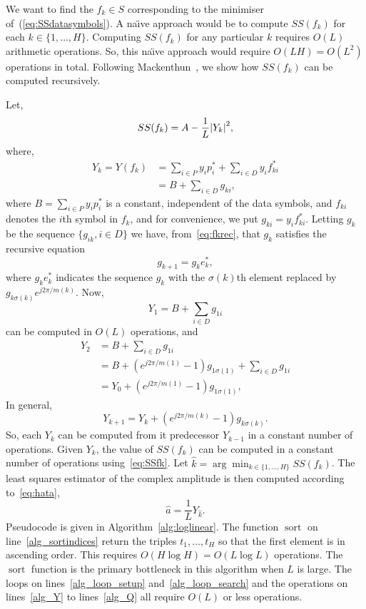 \documentclass[journal]{IEEEtran}
\begin{document}
We want to find the $f_k \in S$ corresponding to the minimiser of~(\ref{eq:SSdatasymbols}).  A na\"{\i}ve approach would be to compute $SS(f_k)$ for each $k \in \{1,\dots,H\}$.  Computing $SS(f_k)$ for any particular $k$ requires $O(L)$ arithmetic operations.  So, this na\"{\i}ve approach would require $O(LH) = O(L^2)$ operations in total.  Following Mackenthun~\cite{Mackenthun1994}, we show how $SS(f_k)$ can be computed recursively.

Let,
\begin{equation}\label{eq:SSfk}
SS(f_k) = A - \frac{1}{L}{\left\vert Y_k \right\vert}^2,
\end{equation}
where, 
\begin{align*}
Y_k = Y( f_k ) &= \sum_{i \in P} y_i p_i^*  + \sum_{i \in D} y_i f_{ki}^* \\
&= B + \sum_{i \in D}g_{ki},
\end{align*}
where $B = \sum_{i \in P} y_i p_i^*$ is a constant, independent of the data symbols, and $f_{ki}$ denotes the $i$th symbol in $f_k$, and for convenience, we put $g_{ki}  = y_i f_{ki}^*$.  Letting $g_{k}$ be the sequence $\{g_{ik}, i \in D\}$ we have, from~\eqref{eq:fkrec}, that $g_k$ satisfies the recursive equation
\[
g_{k+1} = g_{k} e_{k}^*,
\]
where $g_{k} e_{k}^*$ indicates the sequence $g_k$ with the $\sigma(k)$th element replaced by $g_{k \sigma(k)}e^{j2\pi/m(k)}$.  Now,
\[
Y_1 = B + \sum_{i \in D} g_{1i}
\] 
can be computed in $O(L)$ operations, and
\begin{align*}
Y_2 &= B + \sum_{i \in D} g_{1i} \\
&= B +  (e^{j2\pi/m(1)} - 1)g_{1\sigma(1)} + \sum_{i \in D} g_{1i} \\
&= Y_0 + (e^{j2\pi/m(1)} - 1)g_{1\sigma(1)},
\end{align*}
In general,
\[
Y_{k+1} = Y_k + (e^{j2\pi/m(k)} - 1) g_{k\sigma(k)}.
\]
So, each $Y_k$ can be computed from it predecessor $Y_{k-1}$ in a constant number of operations.  Given $Y_k$, the value of $SS(f_k)$ can be computed in a constant number of operations using~\eqref{eq:SSfk}.  Let $\hat{k} = \arg\min_{k\in\{1,\dots,H\}} SS(f_k)$.  The least squares estimator of the complex amplitude is then computed according to~\eqref{eq:hata},
\begin{equation}\label{eq:ahatYhat}
\hat{a} = \frac{1}{L} Y_{\hat{k}}.
\end{equation}
Pseudocode is given in Algorithm~\ref{alg:loglinear}.   The function $\operatorname{sort}$ on line~\ref{alg_sortindices} return the triples $t_1,\dots,t_H$ so that the first element is in ascending order.   This requires $O(H \log H) = O(L \log L)$ operations.  The $\operatorname{sort}$ function is the primary bottleneck in this algorithm when $L$ is large.  The loops on lines~\ref{alg_loop_setup} and~\ref{alg_loop_search} and the operations on lines~\ref{alg_Y} to lines~\ref{alg_Q} all require $O(L)$ or less operations.  %
\end{document}
